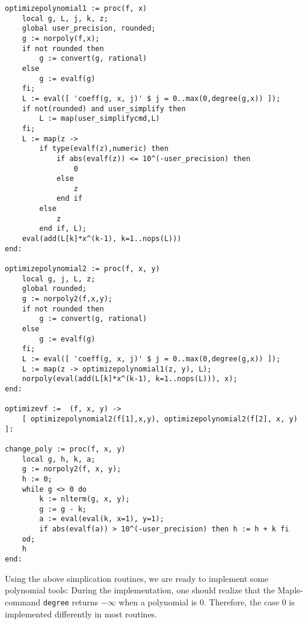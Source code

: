 \documentclass[a4paper,10pt]{article}
\begin{document}
\begin{lstlisting}[name=tools]
optimizepolynomial1 := proc(f, x)
    local g, L, j, k, z;
    global user_precision, rounded;
    g := norpoly(f,x);
    if not rounded then
        g := convert(g, rational)
    else
        g := evalf(g)
    fi;
    L := eval([ 'coeff(g, x, j)' $ j = 0..max(0,degree(g,x)) ]);
    if not(rounded) and user_simplify then
        L := map(user_simplifycmd,L)
    fi;
    L := map(z ->
        if type(evalf(z),numeric) then
            if abs(evalf(z)) <= 10^(-user_precision) then
                0
            else
                z
            end if
        else
            z
        end if, L);
    eval(add(L[k]*x^(k-1), k=1..nops(L)))
end:

optimizepolynomial2 := proc(f, x, y)
    local g, j, L, z;
    global rounded;
    g := norpoly2(f,x,y);
    if not rounded then
        g := convert(g, rational)
    else
        g := evalf(g)
    fi;
    L := eval([ 'coeff(g, x, j)' $ j = 0..max(0,degree(g,x)) ]);
    L := map(z -> optimizepolynomial1(z, y), L);
    norpoly(eval(add(L[k]*x^(k-1), k=1..nops(L))), x);
end:

optimizevf :=  (f, x, y) ->
    [ optimizepolynomial2(f[1],x,y), optimizepolynomial2(f[2], x, y) ]:

change_poly := proc(f, x, y)
    local g, h, k, a;
    g := norpoly2(f, x, y);
    h := 0;
    while g <> 0 do
        k := nlterm(g, x, y);
        g := g - k;
        a := eval(eval(k, x=1), y=1);
        if abs(evalf(a)) > 10^(-user_precision) then h := h + k fi
    od;
    h
end:

\end{lstlisting}

Using the above simplication routines, we are ready to implement some polynomial tools:
During the implementation, one should realize that the Maple-command \verb+degree+ returns $-\infty$ when
a polynomial is $0$.  Therefore, the case $0$ is implemented differently in most routines.
\end{document}
